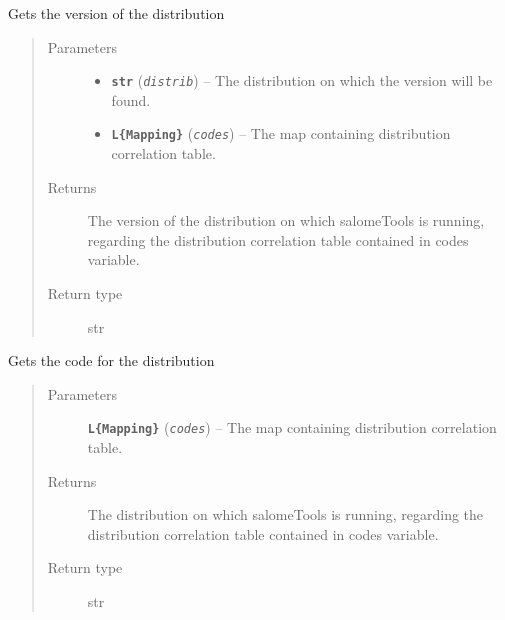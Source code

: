 \documentclass[a4paper,10pt,english]{sphinxmanual}
\begin{document}
\begin{fulllineitems}
\label{commands/apidoc/src:src.architecture.get_distrib_version}
Gets the version of the distribution
\begin{quote}\begin{description}
\item[{Parameters}] \leavevmode\begin{itemize}
\item {} 
\textbf{\texttt{str}} (\emph{\texttt{distrib}}) -- The distribution on which the version will be found.

\item {} 
\textbf{\texttt{L\{Mapping\}}} (\emph{\texttt{codes}}) -- The map containing distribution correlation table.

\end{itemize}

\item[{Returns}] \leavevmode
The version of the distribution on which salomeTools is running, 
regarding the distribution correlation table contained in codes 
variable.

\item[{Return type}] \leavevmode
str

\end{description}\end{quote}

\end{fulllineitems}


\begin{fulllineitems}
\label{commands/apidoc/src:src.architecture.get_distribution}
Gets the code for the distribution
\begin{quote}\begin{description}
\item[{Parameters}] \leavevmode
\textbf{\texttt{L\{Mapping\}}} (\emph{\texttt{codes}}) -- The map containing distribution correlation table.

\item[{Returns}] \leavevmode
The distribution on which salomeTools is running, regarding the 
distribution correlation table contained in codes variable.

\item[{Return type}] \leavevmode
str

\end{description}\end{quote}

\end{fulllineitems}
\end{document}
